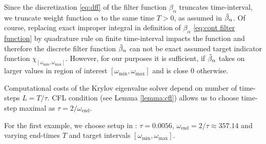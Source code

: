\documentclass[a4paper,11pt,bibliography=totoc,listof=totoc,headinclude=true,cleardoublepage=empty,oneside]{scrbook}
\newcommand{\dff}{\Tilde{\beta}_\alpha}
\newcommand{\e}{\mathrm{end}}
\begin{document}
Since the discretization \eqref{eq:dff} of the filter function $\beta_\alpha$ truncates time-interval, we truncate weight function $\alpha$ to the same time $T>0$, as assumed in $\dff$. Of course, replacing exact improper integral in definition of $\beta_\alpha$ \eqref{eq:cont filter function} by quadrature rule on finite time-interval impacts the function and therefore the discrete filter function $\dff$ can not be exact assumed target indicator function $\chi_{\left[\omega_{\min}, \omega_{\max}\right]}$. However, for our purposes it is sufficient, if $\dff$ takes on larger values in region of interest $\left[\omega_{\min}, \omega_{\max}\right]$ and is close 0 otherwise. 

Computational costs of the Krylov eigenvalue solver depend on number of time-steps $L=T/\tau$. CFL condition (see Lemma \ref{lemma:cfl}) allows us to choose time-step maximal as $\tau = 2/\omega_{\e}$. 

For the first example, we choose setup in \cite[section 3.1.2]{nannen}: $\tau = 0.0056$, $\omega_\e = 2/\tau \approx 357.14$ and varying end-times $T$ and target intervals $\left[\omega_{\min}, \omega_{\max}\right]$.









 
%

\end{document}
